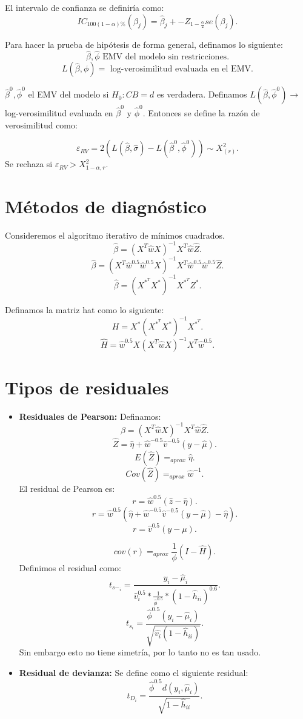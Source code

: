 \documentclass{article}
\begin{document}
El intervalo de confianza se definiría como:
\[ IC_{100{(1-\alpha)}\%}{(\beta_{j})}=\hat{\beta}_{j} +- Z_{1-\frac{\alpha}{2}}se{(\beta_{j})} .\]

Para hacer la prueba de hipótesis de forma general, definamos lo siguiente:
\[ \hat{\beta},\hat{\phi} \text{ EMV del modelo sin restricciones}.\]
\[ L{(\hat{\beta},\phi)}=\text{ log-verosimilitud evaluada en el EMV}.\]

$\hat{\beta}^{0}, \hat{\phi}^{0}$ el EMV del modelo si $H_{0}: CB=d$ es verdadera. Definamos $L{(\hat{\beta},\hat{\phi}^{0})} \rightarrow $ log-verosimilitud evaluada en $\hat{\beta}^{0}$ y $\hat{\phi}^{0}$. Entonces se define la razón de verosimilitud como:

\[ \varepsilon_{RV}=2{(L{(\hat{\beta},\hat{\sigma})}-L{(\hat{\beta}^{0},\hat{\phi}^{0})})}\sim X^{2}_{{(r)}}.\]
Se rechaza si $\varepsilon_{RV}> X^{2}_{1-\alpha,r}$.

\section{Métodos de diagnóstico}
Consideremos el algoritmo iterativo de mínimos cuadrados.
\[ \hat{\beta}={(X^{T}\hat{w}X)}^{-1}X^{T}\hat{w}\hat{Z}.\]
\[ \hat{\beta}={(X^{T}\hat{w}^{0.5}\hat{w}^{0.5}X)}^{-1}X^{T}\hat{w}^{0.5}\hat{w}^{0.5}\hat{Z}.\]
\[ \hat{\beta}={(X^{*^{T}}X^{*})}^{-1}X^{*^{T}}Z^{*}.\]

Definamos la matriz hat como lo siguiente:
\[ H=X^{*}{(X^{*^{T}}X^{*})}^{-1}X^{*^{T}}.\]
\[ \hat{H}=\hat{w}^{0.5}X{(X^{T}\hat{w}X)}^{-1}X^{T}\hat{w}^{0.5}.\]

\section{Tipos de residuales}
\begin{itemize}
	\item \textbf{Residuales de Pearson: } Definamos:
		\[ \hat{\beta}={(X^{T}\hat{w}X)}^{-1}X^{T}\hat{w}\hat{Z}.\]
		\[ \hat{Z}=\hat{\eta}+\hat{w}^{-0.5}\hat{v}^{-0.5}{(y-\hat{\mu})}.\]
		\[ E{(\hat{Z})} =_{aprox}\hat{\eta}.\]
		\[ Cov{(\hat{Z})}=_{aprox}\hat{w}^{-1}.\]
		El residual de Pearson es:
		\[ r=\hat{w}^{0.5}{(\hat{z}-\hat{\eta})}.\]
		\[ r=\hat{w}^{0.5}{(\hat{\eta}+\hat{w}^{-0.5}\hat{v}^{-0.5}{(y-\hat{\mu})}-\hat{\eta})}.\]
		\[ r=\hat{v}^{0.5}{(y-\mu)}.\]

	\[	cov(r) =_{aprox} \frac{1}{\phi}{(I-\hat{H})}.\]
	Definimos el residual como:
	\[ t_{s-_{i}}=\frac{y_{i}-\hat{\mu}_{i}}{\hat{v}_{i}^{0.5}*\frac{1}{\hat{\phi}^{0.5}}*{(1-\hat{h}_{ii})}^{0.6}}.\]
	\[ t_{s_{i}}=\frac{\hat{\phi}^{0.5}{(y_{i}-\hat{\mu}_{i})}}{\sqrt{\hat{v_{i}}{(1-\hat{h}_{ii})}}}.\]
	Sin embargo esto no tiene simetría, por lo tanto no es tan usado.
\item \textbf{Residual de devianza:} Se define como el siguiente residual:
	\[ t_{D_{i}}=\frac{\hat{\phi}^{0.5}d{(y_{i},\hat{\mu}_{i})}}{\sqrt{1-\hat{h}_{ii}}}.\]
\end{itemize}
\end{document}

